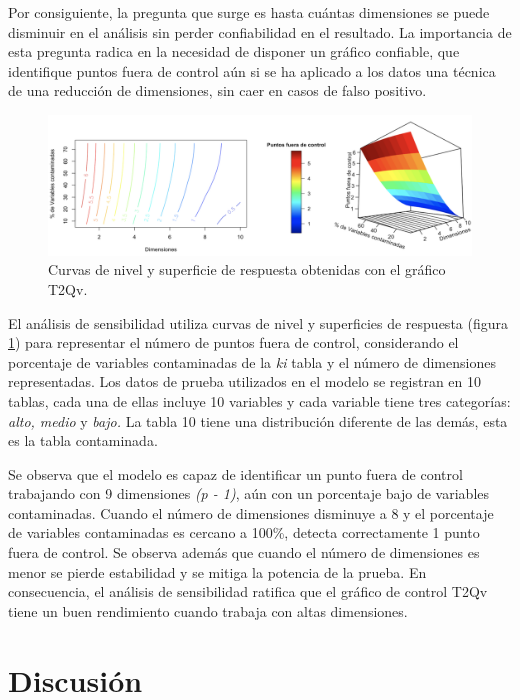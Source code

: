 \documentclass[mathematics,article,submit,moreauthors,pdftex]{mdpi}
\begin{document}
Por consiguiente, la pregunta que surge es hasta cuántas dimensiones se
puede disminuir en el análisis sin perder confiabilidad en el resultado.
La importancia de esta pregunta radica en la necesidad de disponer un
gráfico confiable, que identifique puntos fuera de control aún si se ha
aplicado a los datos una técnica de una reducción de dimensiones, sin
caer en casos de falso positivo.

\begin{figure}[H]


\begin{center}\includegraphics[width=0.9\linewidth,]{sensibilidad} \end{center}

\caption{Curvas de nivel y superficie de respuesta obtenidas con el gráfico T2Qv.}
\label{fig:sensibilidad}
\end{figure}

El análisis de sensibilidad utiliza curvas de nivel y superficies de
respuesta (figura \ref{fig:sensibilidad}) para representar el número de
puntos fuera de control, considerando el porcentaje de variables
contaminadas de la \emph{ki} tabla y el número de dimensiones
representadas. Los datos de prueba utilizados en el modelo se registran
en 10 tablas, cada una de ellas incluye 10 variables y cada variable
tiene tres categorías: \emph{alto, medio} y \emph{bajo.} La tabla 10
tiene una distribución diferente de las demás, esta es la tabla
contaminada.

Se observa que el modelo es capaz de identificar un punto fuera de
control trabajando con 9 dimensiones \emph{(p - 1)}, aún con un
porcentaje bajo de variables contaminadas. Cuando el número de
dimensiones disminuye a 8 y el porcentaje de variables contaminadas es
cercano a 100\%, detecta correctamente 1 punto fuera de control. Se
observa además que cuando el número de dimensiones es menor se pierde
estabilidad y se mitiga la potencia de la prueba. En consecuencia, el
análisis de sensibilidad ratifica que el gráfico de control T2Qv tiene
un buen rendimiento cuando trabaja con altas dimensiones.

\hypertarget{discusiuxf3n}{%
\section{Discusión}\label{discusiuxf3n}}
\end{document}

